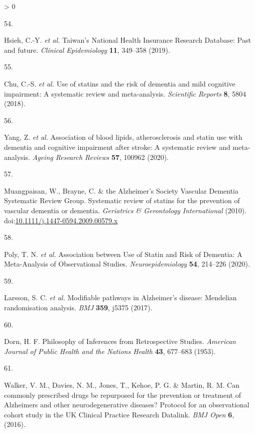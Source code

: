 \documentclass[a4paper, twoside]{templates/ociamthesis}
\newlength{\cslhangindent}
\newlength{\csllabelwidth}
\newenvironment{CSLReferences}[3] %
 {%
  \setlength{\parindent}{0pt}
  \ifodd #1 \everypar{\setlength{\hangindent}{\cslhangindent}}\ignorespaces\fi
  \ifnum #2 > 0
  \setlength{\parskip}{#2\baselineskip}
  \fi
 }%
 {}
\newcommand{\CSLLeftMargin}[1]{\parbox[t]{\maxof{\widthof{#1}}{\csllabelwidth}}{#1}}
\newcommand{\CSLRightInline}[1]{\parbox[t]{\linewidth - \csllabelwidth}{#1}}
\begin{document}
\begin{CSLReferences}{0}{0}
\leavevmode\hypertarget{ref-hsieh2019}{}%
\CSLLeftMargin{54. }
\CSLRightInline{Hsieh, C.-Y. \emph{et al.} Taiwan's {National Health Insurance Research Database}: Past and future. \emph{Clinical Epidemiology} \textbf{11}, 349--358 (2019).}

\leavevmode\hypertarget{ref-chu2018b}{}%
\CSLLeftMargin{55. }
\CSLRightInline{Chu, C.-S. \emph{et al.} Use of statins and the risk of dementia and mild cognitive impairment: {A} systematic review and meta-analysis. \emph{Scientific Reports} \textbf{8}, 5804 (2018).}

\leavevmode\hypertarget{ref-yang2020}{}%
\CSLLeftMargin{56. }
\CSLRightInline{Yang, Z. \emph{et al.} Association of blood lipids, atherosclerosis and statin use with dementia and cognitive impairment after stroke: {A} systematic review and meta-analysis. \emph{Ageing Research Reviews} \textbf{57}, 100962 (2020).}

\leavevmode\hypertarget{ref-muangpaisan2010}{}%
\CSLLeftMargin{57. }
\CSLRightInline{Muangpaisan, W., Brayne, C. \& the Alzheimer's Society Vascular Dementia Systematic Review Group. Systematic review of statins for the prevention of vascular dementia or dementia. \emph{Geriatrics \& Gerontology International} (2010). doi:\href{https://doi.org/10.1111/j.1447-0594.2009.00579.x}{10.1111/j.1447-0594.2009.00579.x}}

\leavevmode\hypertarget{ref-poly2020b}{}%
\CSLLeftMargin{58. }
\CSLRightInline{Poly, T. N. \emph{et al.} Association between {Use} of {Statin} and {Risk} of {Dementia}: {A Meta}-{Analysis} of {Observational Studies}. \emph{Neuroepidemiology} \textbf{54}, 214--226 (2020).}

\leavevmode\hypertarget{ref-larsson2017a}{}%
\CSLLeftMargin{59. }
\CSLRightInline{Larsson, S. C. \emph{et al.} Modifiable pathways in {Alzheimer}'s disease: {Mendelian} randomisation analysis. \emph{BMJ} \textbf{359}, j5375 (2017).}

\leavevmode\hypertarget{ref-dorn1953}{}%
\CSLLeftMargin{60. }
\CSLRightInline{Dorn, H. F. Philosophy of {Inferences} from {Retrospective Studies}. \emph{American Journal of Public Health and the Nations Health} \textbf{43}, 677--683 (1953).}

\leavevmode\hypertarget{ref-walker2016a}{}%
\CSLLeftMargin{61. }
\CSLRightInline{Walker, V. M., Davies, N. M., Jones, T., Kehoe, P. G. \& Martin, R. M. Can commonly prescribed drugs be repurposed for the prevention or treatment of {Alzheimers} and other neurodegenerative diseases? {Protocol} for an observational cohort study in the {UK Clinical Practice Research Datalink}. \emph{BMJ Open} \textbf{6}, (2016).}


\end{CSLReferences}
\end{document}
